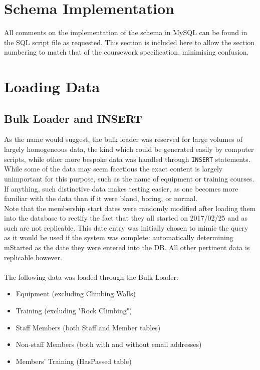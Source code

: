 \documentclass[a4paper, titlepage]{article}
\begin{document}
\section{Schema Implementation}
All comments on the implementation of the schema in MySQL can be found in the SQL script file as requested. This section is included here to allow the section numbering to match that of the coursework specification, minimising confusion.


\section{Loading Data} \label{sec:data}
\subsection{Bulk Loader and INSERT}
As the name would suggest, the bulk loader was reserved for large volumes of largely homogeneous data, the kind which could be generated easily by computer scripts, while other more bespoke data was handled through \texttt{INSERT} statements. While some of the data may seem facetious the exact content is largely unimportant for this purpose, such as the name of equipment or training courses. If anything, such distinctive data makes testing easier, as one becomes more familiar with the data than if it were bland, boring, or normal.
\\
Note that the membership start dates were randomly modified after loading them into the database to rectify the fact that they all started on 2017/02/25 and as such are not replicable. This date entry was initially chosen to mimic the query as it would be used if the system was complete: automatically determining mStarted as the date they were entered into the DB. All other pertinent data is replicable however.
\\ \\
The following data was loaded through the Bulk Loader:
\begin{itemize}
	\item Equipment (excluding Climbing Walls)
	\item Training (excluding "Rock Climbing")
	\item Staff Members (both Staff and Member tables)
	\item Non-staff Members (both with and without email addresses)
	\item Members' Training (HasPassed table)
\end{itemize}
\ \\
\end{document}
